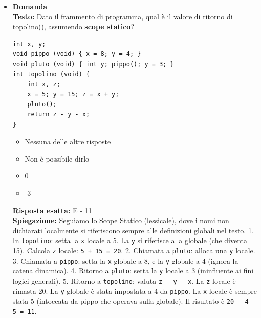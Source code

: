 \documentclass[12pt, a4paper]{article}
\newcounter{domandateoria}
\begin{document}
\begin{itemize}
    \item {}\textbf{Domanda \thedomandateoria} \\
    \textbf{Testo:} Dato il frammento di programma, qual è il valore di ritorno di topolino(), assumendo \textbf{scope statico}?
\begin{verbatim}
int x, y;
void pippo (void) { x = 8; y = 4; }
void pluto (void) { int y; pippo(); y = 3; }
int topolino (void) {
    int x, z;
    x = 5; y = 15; z = x + y;
    pluto();
    return z - y - x;
}
\end{verbatim}
    \begin{itemize}
        \item[A)] Nessuna delle altre risposte
        \item[B)] Non è possibile dirlo
        \item[C)] 0
        \item[D)] -3
    \end{itemize}
    \textbf{Risposta esatta:} E - 11 \\
    \textbf{Spiegazione:} Seguiamo lo Scope Statico (lessicale), dove i nomi non dichiarati localmente si riferiscono sempre alle definizioni globali nel testo.
    1. In \texttt{topolino}: setta la \texttt{x} locale a 5. La \texttt{y} si riferisce alla globale (che diventa 15). Calcola \texttt{z} locale: \texttt{5 + 15 = 20}.
    2. Chiamata a \texttt{pluto}: alloca una \texttt{y} locale.
    3. Chiamata a \texttt{pippo}: setta la \texttt{x} globale a 8, e la \texttt{y} globale a 4 (ignora la catena dinamica).
    4. Ritorno a \texttt{pluto}: setta la \texttt{y} locale a 3 (ininfluente ai fini logici generali).
    5. Ritorno a \texttt{topolino}: valuta \texttt{z - y - x}. La \texttt{z} locale è rimasta 20. La \texttt{y} globale è stata impostata a 4 da \texttt{pippo}. La \texttt{x} locale è sempre stata 5 (intoccata da pippo che operava sulla globale).
    Il risultato è \texttt{20 - 4 - 5 = 11}.
    \vspace{0.3cm}


\end{itemize}
\end{document}
